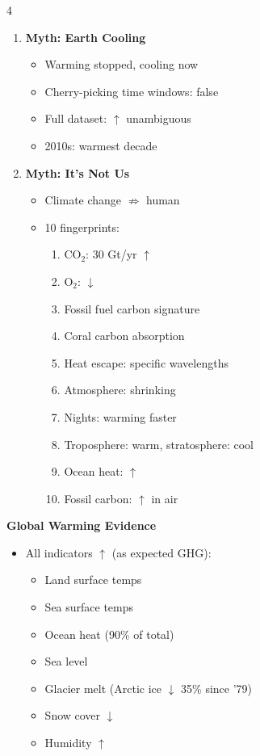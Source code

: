 \documentclass[10pt,landscape,a4paper]{article}
\begin{document}
\begin{multicols*}{4}
\begin{enumerate}
    \item \textbf{Myth: Earth Cooling}
          \begin{itemize}
            \item[$\times$] Warming stopped, cooling now
            \item[$\checkmark$] Cherry-picking time windows: false
            \item[$\checkmark$] Full dataset: $\uparrow$ unambiguous
            \item[$\checkmark$] 2010s: warmest decade
          \end{itemize}

    \item \textbf{Myth: It's Not Us}
          \begin{itemize}
            \item[$\times$] Climate change $\not\Rightarrow$ human
            \item[$\checkmark$] 10 fingerprints:
                  \begin{enumerate}
                    \item CO$_2$: 30 Gt/yr $\uparrow$
                    \item O$_2$: $\downarrow$
                    \item Fossil fuel carbon signature
                    \item Coral carbon absorption
                    \item Heat escape: specific wavelengths
                    \item Atmosphere: shrinking
                    \item Nights: warming faster
                    \item Troposphere: warm, stratosphere: cool
                    \item Ocean heat: $\uparrow$
                    \item Fossil carbon: $\uparrow$ in air
                  \end{enumerate}
          \end{itemize}
  \end{enumerate}

  \textbf{Global Warming Evidence}
  \begin{itemize}
    \item All indicators $\uparrow$ (as expected GHG):
          \begin{itemize}
            \item Land surface temps
            \item Sea surface temps
            \item Ocean heat (90\% of total)
            \item Sea level
            \item Glacier melt (Arctic ice $\downarrow$ 35\% since '79)
            \item Snow cover $\downarrow$
            \item Humidity $\uparrow$
          \end{itemize}
  \end{itemize}


\end{multicols*}
\end{document}
